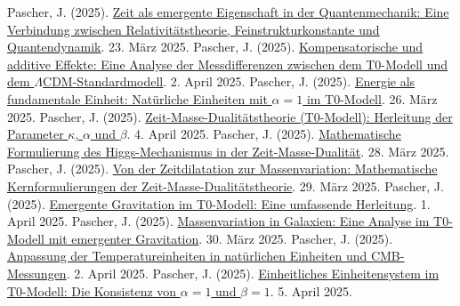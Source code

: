 \documentclass[12pt,a4paper]{article}
\begin{document}
	\begin{thebibliography}{99}
		 Pascher, J. (2025). \href{https://github.com/jpascher/T0-Time-Mass-Duality/tree/main/2/pdf/Deutsch/ZeitEmergentQM.pdf}{Zeit als emergente Eigenschaft in der Quantenmechanik: Eine Verbindung zwischen Relativitätstheorie, Feinstrukturkonstante und Quantendynamik}. 23. März 2025.
		 Pascher, J. (2025). \href{https://github.com/jpascher/T0-Time-Mass-Duality/tree/main/2/pdf/Deutsch/MessdifferenzenT0Standard.pdf}{Kompensatorische und additive Effekte: Eine Analyse der Messdifferenzen zwischen dem T0-Modell und dem \(\Lambda\)CDM-Standardmodell}. 2. April 2025.
		 Pascher, J. (2025). \href{https://github.com/jpascher/T0-Time-Mass-Duality/tree/main/2/pdf/Deutsch/NatEinheitenAlpha1.pdf}{Energie als fundamentale Einheit: Natürliche Einheiten mit \(\alpha = 1\) im T0-Modell}. 26. März 2025.
		 Pascher, J. (2025). \href{https://github.com/jpascher/T0-Time-Mass-Duality/tree/main/2/pdf/Deutsch/ZeitMasseT0Params.pdf}{Zeit-Masse-Dualitätstheorie (T0-Modell): Herleitung der Parameter \(\kappa\), \(\alpha\) und \(\beta\)}. 4. April 2025.
		 Pascher, J. (2025). \href{https://github.com/jpascher/T0-Time-Mass-Duality/tree/main/2/pdf/Deutsch/MathHiggsZeitMasse.pdf}{Mathematische Formulierung des Higgs-Mechanismus in der Zeit-Masse-Dualität}. 28. März 2025.
		 Pascher, J. (2025). \href{https://github.com/jpascher/T0-Time-Mass-Duality/tree/main/2/pdf/Deutsch/MathZeitMasseLagrange.pdf}{Von der Zeitdilatation zur Massenvariation: Mathematische Kernformulierungen der Zeit-Masse-Dualitätstheorie}. 29. März 2025.
		 Pascher, J. (2025). \href{https://github.com/jpascher/T0-Time-Mass-Duality/tree/main/2/pdf/Deutsch/EmergentGravT0.pdf}{Emergente Gravitation im T0-Modell: Eine umfassende Herleitung}. 1. April 2025.
		 Pascher, J. (2025). \href{https://github.com/jpascher/T0-Time-Mass-Duality/tree/main/2/pdf/Deutsch/MassVarGalaxien.pdf}{Massenvariation in Galaxien: Eine Analyse im T0-Modell mit emergenter Gravitation}. 30. März 2025.
		 Pascher, J. (2025). \href{https://github.com/jpascher/T0-Time-Mass-Duality/tree/main/2/pdf/Deutsch/NatEinheitenAlpha1.pdf}{Anpassung der Temperatureinheiten in natürlichen Einheiten und CMB-Messungen}. 2. April 2025.
		 Pascher, J. (2025). \href{https://github.com/jpascher/T0-Time-Mass-Duality/tree/main/2/pdf/Deutsch/Alpha1Beta1Konsistenz.pdf}{Einheitliches Einheitensystem im T0-Modell: Die Konsistenz von \(\alpha = 1\) und \(\beta = 1\)}. 5. April 2025.

\end{thebibliography}
\end{document}
